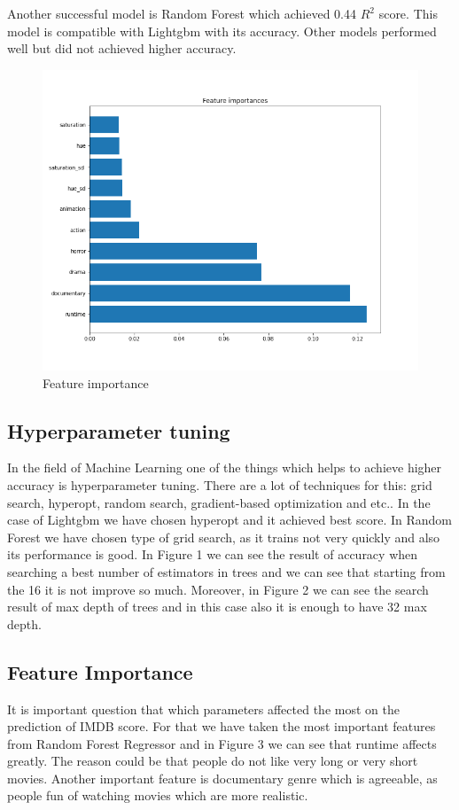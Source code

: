 \documentclass{article}
\begin{document}
Another successful model is Random Forest which achieved 0.44 $R^2$ score. This model is compatible with Lightgbm with its accuracy. Other models performed well but did not achieved higher accuracy. 

\begin{figure}
	\centering
	\includegraphics[width=1\linewidth, height=0.4\textheight, keepaspectratio]{../plots/feature_importancvce.png}
	\caption{Feature importance}
	\label{fig:feature_imp}
\end{figure}

\subsection{Hyperparameter tuning}
In the field of Machine Learning one of the things which helps to achieve higher accuracy is hyperparameter tuning. There are a lot of techniques  for this: grid search, hyperopt, random search, gradient-based optimization and etc.. In the case of Lightgbm we have chosen hyperopt and it achieved best score. In Random Forest we have chosen type of grid search, as it trains not very quickly and also its performance is good. In Figure 1 we can see the result of accuracy when searching a best number of estimators in trees and we can see that starting from the 16 it is not improve so much. Moreover, in Figure 2 we can see the search result of max depth of trees and in this case also it is enough to have 32 max depth. 

\subsection{Feature Importance}
It is important question that which parameters affected the most on the prediction of IMDB score. For that we have taken the most important features from Random Forest Regressor and in Figure 3 we can see that runtime affects greatly. The reason could be that people do not like very long or very short movies. Another important feature is documentary genre which is agreeable, as people fun of watching movies which are more realistic. 
\end{document}
